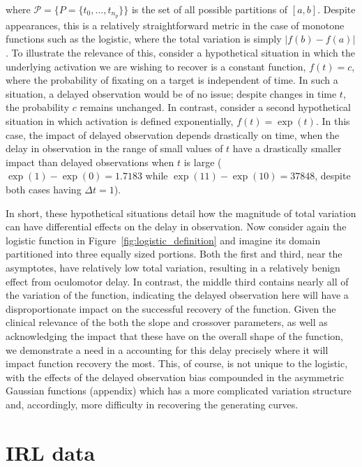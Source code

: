 where $\mathcal{P} = \{P = \{t_0, \dots, t_{n_p}\} \}$ is the set of all possible partitions of $[a,b]$. Despite appearances, this is a relatively straightforward metric in the case of monotone functions such as the logistic, where the total variation is simply $|f(b) - f(a)|$. To illustrate the relevance of this, consider a hypothetical situation in which the underlying activation we are wishing to recover is a constant function, $f(t) = c$, where the probability of fixating on a target is independent of time. In such a situation, a delayed observation would be of no issue; despite changes in time $t$, the probability $c$ remains unchanged. In contrast, consider a second hypothetical situation in which activation is defined exponentially, $f(t) = \exp(t)$. In this case, the impact of delayed observation depends drastically on time, when the delay in observation in the range of small values of $t$ have a drastically smaller impact than delayed observations when $t$ is large ($\exp(1) - \exp(0) = 1.7183$ while $\exp(11) - \exp(10) = 37848$, despite both cases having $\Delta t = 1$).

In short, these hypothetical situations detail how the magnitude of total variation can have differential effects on the delay in observation. Now consider again the logistic function in Figure~\ref{fig:logistic_definition} and imagine its domain partitioned into three equally sized portions. Both the first and third, near the asymptotes, have relatively low total variation, resulting in a relatively benign effect from oculomotor delay. In contrast, the middle third contains nearly all of the variation of the function, indicating the delayed observation here will have a disproportionate impact on the successful recovery of the function. Given the clinical relevance of the both the slope and crossover parameters, as well as acknowledging the impact that these have on the overall shape of the function, we demonstrate a need in a accounting for this delay precisely where it will impact function recovery the most. This, of course, is not unique to the logistic, with the effects of the delayed observation bias compounded in the asymmetric Gaussian functions (appendix) which has a more complicated variation structure and, accordingly, more difficulty in recovering the generating curves.


%


\section{IRL data}

